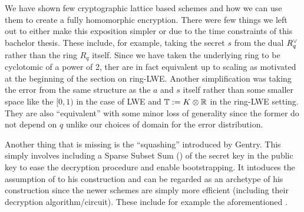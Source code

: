 We have shown few cryptographic lattice based schemes and how we can use them to create a fully homomorphic encryption. There were few things we left out to either make this exposition simpler or due to the time constraints of this bachelor thesis. These include, for example, taking the secret $s$ from the dual $R^{\vee}_q$ rather than the ring $R_q$ itself. Since we have taken the underlying ring to be cyclotomic of a power of 2, ther are in fact equivalent up to scaling as motivated at the beginning of the section on ring-LWE. Another simplification was taking the error from the same structure as the $a$ and $s$ itself rather than some smaller space like the $[0,1)$ in the case of LWE and $\mathbb{T} := K \otimes \mathbb{R}$ in the ring-LWE setting. They are also ``equivalent'' with some minor loss of generality since the former do not depend on $q$ unlike our choices of domain for the error distribution.

Another thing that is missing is the ``squashing'' introduced by Gentry. This simply involves including a Sparse Subset Sum () of the secret key in the public key to ease the decryption procedure and enable bootstrapping. It intoduces the assumption of  to his construction and can be regarded as an archetype of his construction since the newer schemes are simply more efficient (including their decryption algorithm/circuit). These include for example the aforementioned \cite{fhe_rlwe}.


